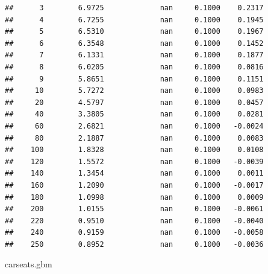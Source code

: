 \documentclass[
]{book}
\newenvironment{Shaded}{\begin{snugshade}}{\end{snugshade}}
\newcommand{\NormalTok}[1]{#1}
\begin{document}
\begin{verbatim}
##      3        6.9725             nan     0.1000    0.2317
##      4        6.7255             nan     0.1000    0.1945
##      5        6.5310             nan     0.1000    0.1967
##      6        6.3548             nan     0.1000    0.1452
##      7        6.1331             nan     0.1000    0.1877
##      8        6.0205             nan     0.1000    0.0816
##      9        5.8651             nan     0.1000    0.1151
##     10        5.7272             nan     0.1000    0.0983
##     20        4.5797             nan     0.1000    0.0457
##     40        3.3805             nan     0.1000    0.0281
##     60        2.6821             nan     0.1000   -0.0024
##     80        2.1887             nan     0.1000    0.0083
##    100        1.8328             nan     0.1000    0.0108
##    120        1.5572             nan     0.1000   -0.0039
##    140        1.3454             nan     0.1000    0.0011
##    160        1.2090             nan     0.1000   -0.0017
##    180        1.0998             nan     0.1000    0.0009
##    200        1.0155             nan     0.1000   -0.0061
##    220        0.9510             nan     0.1000   -0.0040
##    240        0.9159             nan     0.1000   -0.0058
##    250        0.8952             nan     0.1000   -0.0036
\end{verbatim}

\begin{Shaded}
\begin{Highlighting}[]
\NormalTok{carseats.gbm}
\end{Highlighting}
\end{Shaded}
\end{document}

